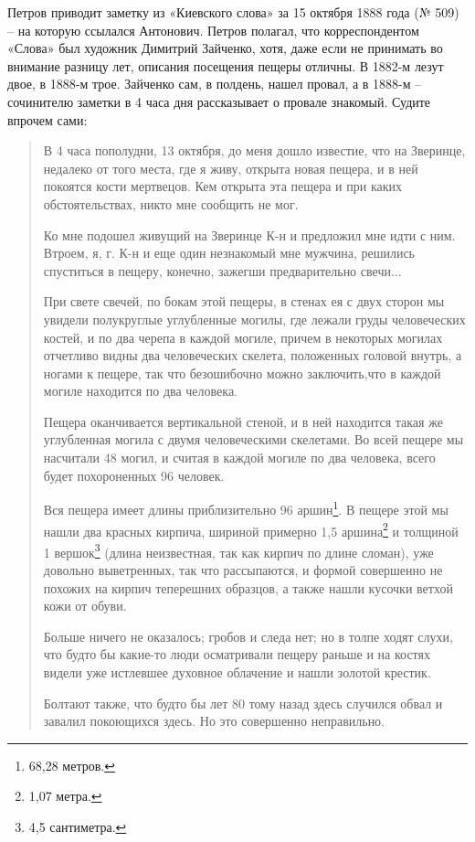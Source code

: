Петров приводит заметку из «Киевского слова» за 15 октября 1888 года (№ 509) – на которую ссылался Антонович. Петров полагал, что корреспондентом «Слова» был художник Димитрий Зайченко, хотя, даже если не принимать во внимание разницу лет, описания посещения пещеры отличны. В 1882-м лезут двое, в 1888-м трое. Зайченко сам, в полдень, нашел провал, а в 1888-м – сочинителю заметки в 4 часа дня рассказывает о провале знакомый. Судите впрочем сами:

\begin{quotation}
В 4 часа пополудни, 13 октября, до меня дошло известие, что на Зверинце, недалеко от того места, где я живу, открыта новая пещера, и в ней покоятся кости мертвецов. Кем открыта эта пещера и при каких обстоятельствах, никто мне сообщить не мог.

Ко мне подошел живущий на Зверинце К-н и предложил мне идти с ним. Втроем, я, г. К-н и еще один незнакомый мне мужчина, решились спуститься в пещеру, конечно, зажегши предварительно свечи...

При свете свечей, по бокам этой пещеры, в стенах ея с двух сторон мы увидели полукруглые углубленные могилы, где лежали груды человеческих костей, и по два черепа в каждой могиле, причем в некоторых могилах отчетливо видны два человеческих скелета, положенных головой внутрь, а ногами к пещере, так что безошибочно можно заключить,что в каждой могиле находится по два человека.

Пещера оканчивается вертикальной стеной, и в ней находится такая же углубленная могила с двумя человеческими скелетами. Во всей пещере мы насчитали 48 могил, и считая в каждой могиле по два человека, всего будет похороненных 96 человек.

Вся пещера имеет длины приблизительно 96 аршин\footnote{68,28 метров.}. В пещере этой мы нашли два красных кирпича, шириной примерно 1,5 аршина\footnote{1,07 метра.} и толщиной 1 вершок\footnote{4,5 сантиметра.} (длина неизвестная, так как кирпич по длине сломан), уже довольно выветренных, так что рассыпаются, и формой совершенно не похожих на кирпич теперешних образцов, а также нашли кусочки ветхой кожи от обуви.

Больше ничего не оказалось; гробов и следа нет; но в толпе ходят слухи, что будто бы какие-то люди осматривали пещеру раньше и на костях видели уже истлевшее духовное облачение и нашли золотой крестик. 

Болтают также, что будто бы лет 80 тому назад здесь случился обвал и завалил покоющихся здесь. Но это совершенно неправильно.
\end{quotation}

